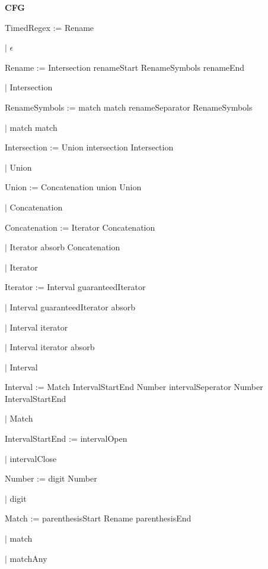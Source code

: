 
\textbf{CFG}

TimedRegex := Rename

\qquad	$\mid$ $\epsilon$

Rename := Intersection renameStart RenameSymbols renameEnd

\qquad $\mid$ Intersection

RenameSymbols := match match renameSeparator RenameSymbols

\qquad $\mid$ match match

Intersection := Union intersection Intersection

\qquad $\mid$ Union

Union := Concatenation union Union

\qquad $\mid$ Concatenation

Concatenation := Iterator Concatenation

\qquad $\mid$ Iterator absorb Concatenation

\qquad $\mid$ Iterator

Iterator := Interval guaranteedIterator

\qquad $\mid$ Interval guaranteedIterator absorb

\qquad $\mid$ Interval iterator

\qquad $\mid$ Interval iterator absorb

\qquad $\mid$ Interval

Interval := Match IntervalStartEnd Number intervalSeperator Number IntervalStartEnd

\qquad $\mid$ Match

IntervalStartEnd := intervalOpen

\qquad $\mid$ intervalClose

Number := digit Number

\qquad $\mid$ digit

Match := parenthesisStart Rename parenthesisEnd

\qquad $\mid$ match

\qquad $\mid$ matchAny

